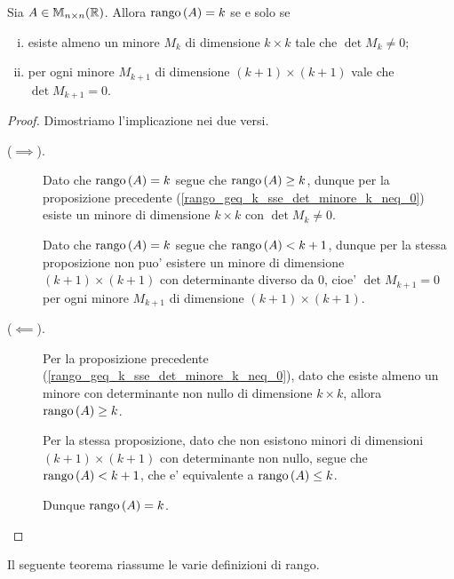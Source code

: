 \begin{proposition}\label{rango_tramite_minori}
    Sia $A \in \mathbb{M}_{n \times n}(\mathbb{R})$.
    Allora $\operatorname{rango}\left( A \right) = k$ se e solo se \begin{enumerate}[(i)]
        \item esiste almeno un minore $M_k$ di dimensione $k \times k$ tale che $\det M_k \neq 0$;
        \item per ogni minore $M_{k+1}$ di dimensione $(k + 1) \times (k + 1)$ vale che $\det M_{k+1} = 0$.
    \end{enumerate} 
\end{proposition}
\begin{proof}
    Dimostriamo l'implicazione nei due versi.
    \begin{description}
        \item[($\implies$).] Dato che $\operatorname{rango}\left( A \right) = k$ segue che $\operatorname{rango}\left( A \right) \geq k$, dunque per la proposizione precedente (\ref{rango_geq_k_sse_det_minore_k_neq_0}) esiste un minore di dimensione $k \times k$ con $\det M_k \neq 0$. 
        
        Dato che $\operatorname{rango}\left( A \right) = k$ segue che $\operatorname{rango}\left( A \right) < k+1$, dunque per la stessa proposizione non puo' esistere un minore di dimensione $(k+1) \times (k+1)$ con determinante diverso da $0$, cioe' $\det M_{k+1} = 0$ per ogni minore $M_{k+1}$ di dimensione $(k+1) \times (k+1)$.
        \item[($\impliedby$).] Per la proposizione precedente (\ref{rango_geq_k_sse_det_minore_k_neq_0}), dato che esiste almeno un minore con determinante non nullo di dimensione $k \times k$, allora $\operatorname{rango}\left( A \right) \geq k$. 
        
        Per la stessa proposizione, dato che non esistono minori di dimensioni $(k+1) \times (k+1)$ con determinante non nullo, segue che $\operatorname{rango}\left( A \right) < k+1$, che e' equivalente a $\operatorname{rango}\left( A \right) \leq k$.
        
        Dunque $\operatorname{rango}\left( A \right) = k$. \qedhere
    \end{description}
\end{proof}

Il seguente teorema riassume le varie definizioni di rango.

